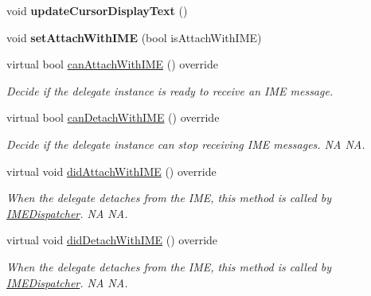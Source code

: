 \begin{DoxyCompactItemize}
void {\bfseries update\+Cursor\+Display\+Text} ()
\item 
\mbox{\label{classTextFieldTTF_a0ec34082d549d7ab8a26eb9e00dc58a0}} 
void {\bfseries set\+Attach\+With\+I\+ME} (bool is\+Attach\+With\+I\+ME)
\item 
virtual bool \hyperlink{classTextFieldTTF_ae7c6616963045e08c065bf42e272f584}{can\+Attach\+With\+I\+ME} () override
\begin{DoxyCompactList}\small\item\em Decide if the delegate instance is ready to receive an I\+ME message. \end{DoxyCompactList}\item 
\mbox{\label{classTextFieldTTF_a32a24a17630e07324cac139e2a8ce7ef}} 
virtual bool \hyperlink{classTextFieldTTF_a32a24a17630e07324cac139e2a8ce7ef}{can\+Detach\+With\+I\+ME} () override
\begin{DoxyCompactList}\small\item\em Decide if the delegate instance can stop receiving I\+ME messages.  NA  NA. \end{DoxyCompactList}\item 
\mbox{\label{classTextFieldTTF_a16990ce5ab42ccaf0c9942f29e733377}} 
virtual void \hyperlink{classTextFieldTTF_a16990ce5ab42ccaf0c9942f29e733377}{did\+Attach\+With\+I\+ME} () override
\begin{DoxyCompactList}\small\item\em When the delegate detaches from the I\+ME, this method is called by \hyperlink{classIMEDispatcher}{I\+M\+E\+Dispatcher}.  NA  NA. \end{DoxyCompactList}\item 
\mbox{\label{classTextFieldTTF_a82892d565a0742f412581d1de8d8612e}} 
virtual void \hyperlink{classTextFieldTTF_a82892d565a0742f412581d1de8d8612e}{did\+Detach\+With\+I\+ME} () override
\begin{DoxyCompactList}\small\item\em When the delegate detaches from the I\+ME, this method is called by \hyperlink{classIMEDispatcher}{I\+M\+E\+Dispatcher}.  NA  NA. \end{DoxyCompactList}\item 
\mbox{\label{classTextFieldTTF_af6b585e4ece109522a7aa5d324c2fc12}} 

\end{DoxyCompactItemize}
